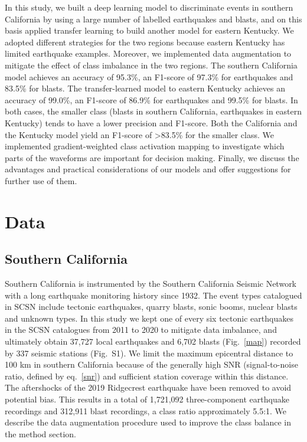 \documentclass{gji}
\begin{document}
In this study, we built a deep learning model to discriminate events in southern California by using a large number of labelled earthquakes and blasts, and on this basis applied transfer learning to build another model for eastern Kentucky. We adopted different strategies for the two regions because eastern Kentucky has limited earthquake examples. Moreover, we implemented data augmentation to mitigate the effect of class imbalance in the two regions. The southern California model achieves an accuracy of 95.3\%, an F1-score of 97.3\% for earthquakes and 83.5\% for blasts. The transfer-learned model to eastern Kentucky achieves an accuracy of 99.0\%, an F1-score of 86.9\% for earthquakes and 99.5\% for blasts. In both cases, the smaller class (blasts in southern California, earthquakes in eastern Kentucky) tends to have a lower precision and F1-score. Both the California and the Kentucky model yield an F1-score of \textgreater{83.5\%} for the smaller class. We implemented gradient-weighted class activation mapping \citep[Grad-CAM,][]{cam} to investigate which parts of the waveforms are important for decision making. Finally, we discuss the advantages and practical considerations of our models and offer suggestions for further use of them.

\section{Data}
\subsection{Southern California}
Southern California is instrumented by the Southern California Seismic Network \citep[SCSN,][]{scsn} with a long earthquake monitoring history since 1932. The event types catalogued in SCSN include tectonic earthquakes, quarry blasts, sonic booms, nuclear blasts and unknown types. In this study we kept one of every six tectonic earthquakes in the SCSN catalogues from 2011 to 2020 to mitigate data imbalance, and ultimately obtain 37,727 local earthquakes and 6,702 blasts (Fig.~\ref{map}) recorded by 337 seismic stations (Fig.~S1). We limit the maximum epicentral distance to 100 km in southern California because of the generally high SNR (signal-to-noise ratio, defined by eq.~\ref{snr}) and sufficient station coverage within this distance. The aftershocks of the 2019 Ridgecrest earthquake have been removed to avoid potential bias. This results in a total of 1,721,092 three-component earthquake recordings and 312,911 blast recordings, a class ratio approximately 5.5:1. We describe the data augmentation procedure used to improve the class balance in the method section.
\end{document}
